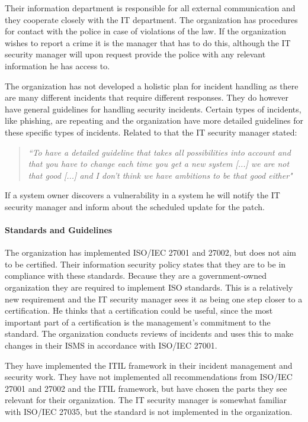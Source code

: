 \documentclass[b5paper, twoside, openright, 11pt]{report}
\begin{document}
Their information department is responsible for all external communication and they cooperate closely with the IT department. The organization has procedures for contact with the police in case of violations of the law. If the organization wishes to report a crime it is the manager that has to do this, although the IT security manager will upon request provide the police with any relevant information he has access to. 

The organization has not developed a holistic plan for incident handling as there are many different incidents that require different responses. They do however have general guidelines for handling security incidents. Certain types of incidents, like phishing, are repeating and the organization have more detailed guidelines for these specific types of incidents. Related to that the IT security manager stated:

\begin{quote}
\textit{``To have a detailed guideline that takes all possibilities into account and that you have to change each time you get a new system %
[...] we are not that good [...] and I don't think we have ambitions to be that good either"}
\end{quote}

If a system owner discovers a vulnerability in a system he will notify the IT security manager and inform about the scheduled update for the patch. 

\paragraph{Standards and Guidelines}
The organization has implemented \acs{ISO}/\acs{IEC} 27001 and 27002, but does not aim to be certified. Their information security policy states that they are to be in compliance with these standards. Because they are a government-owned organization they are required to implement \acs{ISO} standards. This is a relatively new requirement and the IT security manager sees it as being one step closer to a certification. He thinks that a certification could be useful, since the most important part of a certification is the management's commitment to the standard. The organization conducts reviews of incidents and uses this to make changes in their \ac{ISMS} in accordance with \acs{ISO}/\acs{IEC} 27001. 

They have implemented the \ac{ITIL} framework in their incident management and security work. They have not implemented all recommendations from \acs{ISO}/\acs{IEC} 27001 and 27002 and the \ac{ITIL} framework, but have chosen the parts they see relevant for their organization. The IT security manager is somewhat familiar with \acs{ISO}/\acs{IEC} 27035, but the standard is not implemented in the organization.
\end{document}
